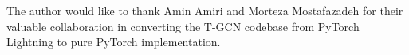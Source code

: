 \documentclass[pdflatex,sn-mathphys-num]{sn-jnl}%
\theoremstyle{thmstyleone}%
\theoremstyle{thmstyletwo}%
\theoremstyle{thmstylethree}%
\begin{document}
The author would like to thank Amin Amiri and Morteza Mostafazadeh for their valuable collaboration in converting the T-GCN codebase from PyTorch Lightning to pure PyTorch implementation.

%


%
%
\end{document}

